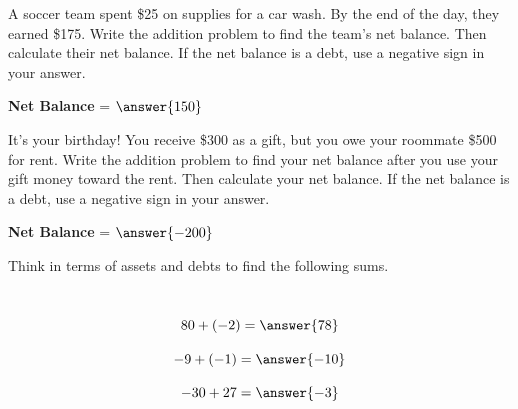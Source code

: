 \documentclass{ximera}[font=12pt]
\begin{document}
\begin{problem}
A soccer team spent \$25 on supplies for a car wash.  By the end of the day, they earned \$175. Write the addition problem to find 
the team's net balance.  Then calculate their net balance.  If the net balance is a debt, use a negative sign in your answer. 


\begin{multipleChoice}
\end{multipleChoice}


\textcolor{orange!75!black}{\textbf{Net Balance}} = $\answer{150}$


\end{problem}


\begin{problem}
It's your birthday!  You receive \$300 as a gift, but you owe your roommate \$500 for rent. Write the addition problem to 
find your net balance after you use your gift money toward the rent.  Then calculate your net balance.  If the net balance is a debt, 
use a negative sign in your answer.

\begin{multipleChoice}
\end{multipleChoice}

\textcolor{orange!75!black}{\textbf{Net Balance}} = $\answer{-200}$

\end{problem}

\begin{problem}
Think in terms of assets and debts to find the following sums. 

~ \\[0.5em]

\[ 80 + (-2)  =\answer{78} \]

\[ -9 + (-1)  =\answer{-10} \]

\[ -30 + 27 =\answer{-3}\]

\end{problem}
\end{document}
